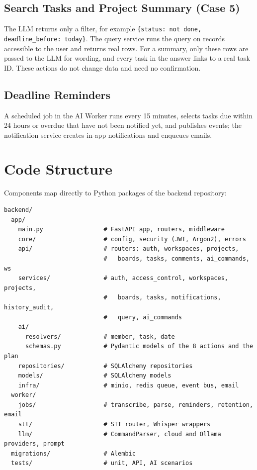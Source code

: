 \documentclass[11pt,a4paper]{article}
\newcommand{\code}[1]{\texttt{#1}}
\begin{document}
\subsection{Search Tasks and Project Summary (Case 5)}

The LLM returns only a filter, for example \code{\{status: not done, deadline\_before: today\}}. The query service runs the query on records accessible to the user and returns real rows. For a summary, only these rows are passed to the LLM for wording, and every task in the answer links to a real task ID. These actions do not change data and need no confirmation.

\subsection{Deadline Reminders}

A scheduled job in the AI Worker runs every 15 minutes, selects tasks due within 24 hours or overdue that have not been notified yet, and publishes events; the notification service creates in-app notifications and enqueues emails.

\section{Code Structure}

Components map directly to Python packages of the backend repository:

\begin{Verbatim}[fontsize=\small,frame=single,framesep=6pt,rulecolor=\color{gray!50}]
backend/
  app/
    main.py                 # FastAPI app, routers, middleware
    core/                   # config, security (JWT, Argon2), errors
    api/                    # routers: auth, workspaces, projects,
                            #   boards, tasks, comments, ai_commands, ws
    services/               # auth, access_control, workspaces, projects,
                            #   boards, tasks, notifications, history_audit,
                            #   query, ai_commands
    ai/
      resolvers/            # member, task, date
      schemas.py            # Pydantic models of the 8 actions and the plan
    repositories/           # SQLAlchemy repositories
    models/                 # SQLAlchemy models
    infra/                  # minio, redis queue, event bus, email
  worker/
    jobs/                   # transcribe, parse, reminders, retention, email
    stt/                    # STT router, Whisper wrappers
    llm/                    # CommandParser, cloud and Ollama providers, prompt
  migrations/               # Alembic
  tests/                    # unit, API, AI scenarios
\end{Verbatim}
\end{document}
